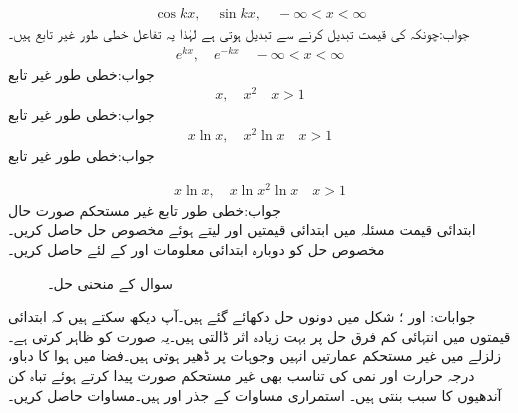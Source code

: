 \begin{align*}
\cos kx, \quad \sin kx, \quad -\infty <x<\infty
\end{align*}
جواب:چونکہ  کی قیمت  تبدیل کرنے سے تبدیل ہوتی ہے لہٰذا یہ تفاعل خطی طور غیر تابع ہیں۔
\begin{align*}
e^{kx}, \quad e^{-kx}\quad -\infty <x<\infty
\end{align*}
جواب:خطی طور غیر تابع
\begin{align*}
x, \quad x^2\quad x>1
\end{align*}
جواب:خطی طور غیر تابع
\begin{align*}
x\ln x, \quad x^2 \ln x\quad x>1
\end{align*}
جواب:خطی طور غیر تابع

\begin{align*}
x\ln x, \quad x\ln x^2 \ln x\quad x>1
\end{align*}
جواب:خطی طور تابع
\quad غیر مستحکم صورت حال\\
ابتدائی قیمت مسئلہ  میں ابتدائی قیمتیں  اور  لیتے ہوئے مخصوص حل حاصل کریں۔مخصوص حل کو دوبارہ ابتدائی معلومات  اور  کے لئے حاصل کریں۔


\begin{figure}
\centering
{}
\caption{سوال  کے منحنی حل۔}
\label{شکل_سوال_سادہ_دو_درجی_غیر_مستحکم_الف}
\end{figure}

جوابات: اور ؛ شکل  میں دونوں حل دکھائے گئے ہیں۔آپ دیکھ سکتے ہیں کہ ابتدائی قیمتوں میں انتہائی کم فرق حل پر بہت زیادہ اثر ڈالتی ہیں۔یہ   صورت کو ظاہر کرتی ہے۔زلزلے  میں غیر مستحکم عمارتیں انہیں وجوہات پر ڈھیر ہوتی ہیں۔فضا میں ہوا کا دباو، درجہ حرارت اور نمی کی تناسب بھی غیر مستحکم صورت پیدا کرتے ہوئے  تباہ کن آندھیوں کا سبب بنتی ہیں۔
استمراری مساوات کے جذر  اور  ہیں۔مساوات  حاصل کریں۔

